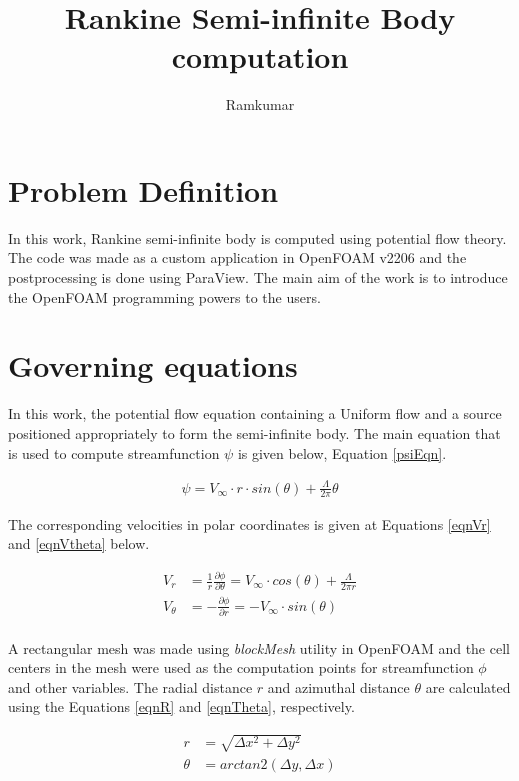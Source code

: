 \documentclass[12pt]{article}
\title{Rankine Semi-infinite Body computation}
\author{Ramkumar}
\begin{document}
\maketitle

\section{Problem Definition}
In this work, Rankine semi-infinite body is computed using potential flow theory.
The code was made as a custom application in OpenFOAM v2206 and the postprocessing
is done using ParaView. The main aim of the work is to introduce the OpenFOAM
programming powers to the users.

\section{Governing equations}\label{eqnSection}
In this work, the potential flow equation containing a Uniform flow and a source
positioned appropriately to form the semi-infinite body. The main equation that
is used to compute streamfunction \(\psi\) is given below, Equation \ref{psiEqn}.


\begin{align}
	\psi = V_{\infty} \cdot r \cdot sin(\theta) + \frac{\Lambda}{2\pi}\theta \label{psiEqn}
\end{align}

The corresponding velocities in polar coordinates is given at Equations \ref{eqnVr}
and \ref{eqnVtheta} below.


\begin{align}
	V_r & = \frac{1}{r}\frac{\partial \phi}{\partial \theta} = V_{\infty} \cdot cos(\theta) + \frac{\Lambda}{2\pi r} \label{eqnVr}\\
	V_{\theta} & = -\frac{\partial \phi}{\partial r} = - V_{\infty} \cdot sin(\theta) \label{eqnVtheta}
\end{align}\\

A rectangular mesh was made using \emph{blockMesh} utility in OpenFOAM and the cell
centers in the mesh were used as the computation points for streamfunction \(\phi\) and
other variables. The radial distance \(r\) and azimuthal distance \(\theta\) are
calculated using the Equations \ref{eqnR} and \ref{eqnTheta}, respectively.

\begin{align}
	r & = \sqrt{\Delta x^2 + \Delta y^2} \label{eqnR} \\
	\theta & = arctan2( \Delta y, \Delta x) \label{eqnTheta}
\end{align}\\
\end{document}
